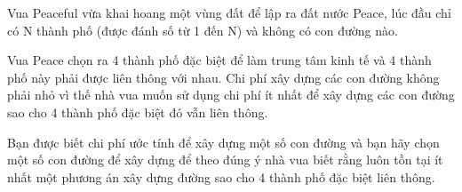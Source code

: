 Vua Peaceful vừa khai hoang một vùng đất để lập ra đất nước Peace, lúc đầu chỉ có N thành phố (được đánh số từ 1 đến N) và không có con đường nào.  

   Vua Peace chọn ra 4 thành phố đặc biệt để làm trung tâm kinh tế và 4 thành phố này phải được liên thông với nhau. Chi phí xây dựng các con đường không phải nhỏ vì thế nhà vua muốn sử dụng chi phí ít nhất để xây dựng các con đường sao cho 4 thành phố đặc biệt đó vẫn liên thông.  

   Bạn được biết chi phí ước tính để xây dựng một số con đường và bạn hãy chọn một số con đường để xây dựng để theo đúng ý nhà vua biết rằng luôn tồn tại ít nhất một phương án xây dựng đường sao cho 4 thành phố đặc biệt liên thông.